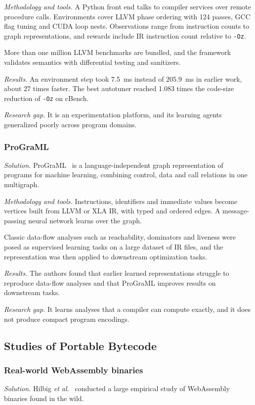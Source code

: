 \documentclass{ieeeaccess}
\begin{document}
\textit{Methodology and tools.} A Python front end talks to compiler services over remote procedure calls. Environments cover LLVM phase ordering with 124 passes, GCC flag tuning and CUDA loop nests. Observations range from instruction counts to graph representations, and rewards include IR instruction count relative to \texttt{-Oz}.

More than one million LLVM benchmarks are bundled, and the framework validates semantics with differential testing and sanitizers.

\textit{Results.} An environment step took 7.5~ms instead of 205.9~ms in earlier work, about 27 times faster. The best autotuner reached 1.083 times the code-size reduction of \texttt{-Oz} on cBench.

\textit{Research gap.} It is an experimentation platform, and its learning agents generalized poorly across program domains.

\subsubsection{ProGraML}
\textit{Solution.} ProGraML~\cite{cummins2021programl} is a language-independent graph representation of programs for machine learning, combining control, data and call relations in one multigraph.

\textit{Methodology and tools.} Instructions, identifiers and immediate values become vertices built from LLVM or XLA IR, with typed and ordered edges. A message-passing neural network learns over the graph.

Classic data-flow analyses such as reachability, dominators and liveness were posed as supervised learning tasks on a large dataset of IR files, and the representation was then applied to downstream optimization tasks.

\textit{Results.} The authors found that earlier learned representations struggle to reproduce data-flow analyses and that ProGraML improves results on downstream tasks.

\textit{Research gap.} It learns analyses that a compiler can compute exactly, and it does not produce compact program encodings.

\subsection{Studies of Portable Bytecode}

\subsubsection{Real-world WebAssembly binaries}
\textit{Solution.} Hilbig \textit{et al.}~\cite{hilbig2021wasm} conducted a large empirical study of WebAssembly binaries found in the wild.
\end{document}
